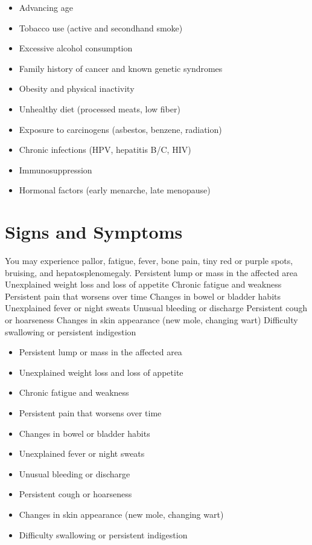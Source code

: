 \begin{itemize}[noitemsep]
  \item Advancing age
  \item Tobacco use (active and secondhand smoke)
  \item Excessive alcohol consumption
  \item Family history of cancer and known genetic syndromes
  \item Obesity and physical inactivity
  \item Unhealthy diet (processed meats, low fiber)
  \item Exposure to carcinogens (asbestos, benzene, radiation)
  \item Chronic infections (HPV, hepatitis B/C, HIV)
  \item Immunosuppression
  \item Hormonal factors (early menarche, late menopause)
\end{itemize}
\section{Signs and Symptoms}
You may experience pallor, fatigue, fever, bone pain, tiny red or purple spots, bruising, and hepatosplenomegaly. Persistent lump or mass in the affected area Unexplained weight loss and loss of appetite Chronic fatigue and weakness Persistent pain that worsens over time Changes in bowel or bladder habits Unexplained fever or night sweats Unusual bleeding or discharge Persistent cough or hoarseness Changes in skin appearance (new mole, changing wart) Difficulty swallowing or persistent indigestion

\begin{itemize}[noitemsep]
  \item Persistent lump or mass in the affected area
  \item Unexplained weight loss and loss of appetite
  \item Chronic fatigue and weakness
  \item Persistent pain that worsens over time
  \item Changes in bowel or bladder habits
  \item Unexplained fever or night sweats
  \item Unusual bleeding or discharge
  \item Persistent cough or hoarseness
  \item Changes in skin appearance (new mole, changing wart)
  \item Difficulty swallowing or persistent indigestion
\end{itemize}
